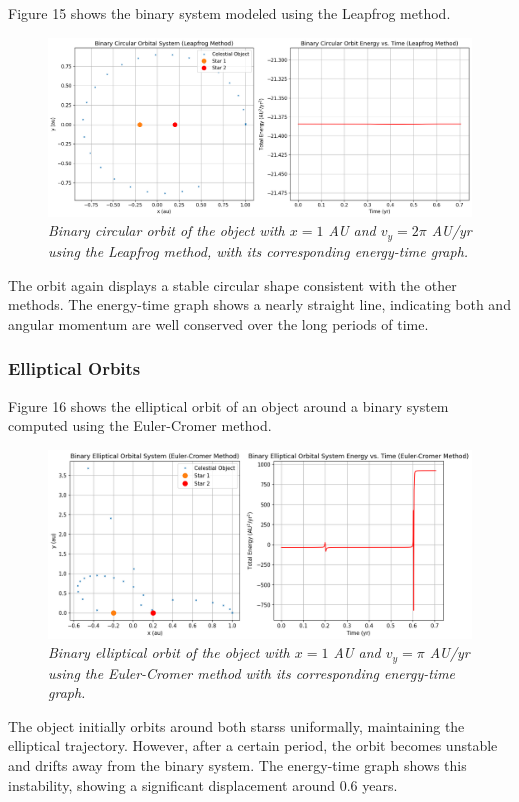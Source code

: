 \documentclass[11 pt, a4paper, twocolumn]{article}
\begin{document}
Figure 15 shows the binary system modeled using the Leapfrog method.
\begin{figure}[H]
  \includegraphics[width=1\linewidth]{binaryleapfrogcircular.png}
  \centering
  \caption{\textit{Binary circular orbit of the object with $x = 1$ AU and $v_y = 2\pi$ AU/yr using
  the Leapfrog method, with its corresponding energy-time graph.}} 
\end{figure}
The orbit again displays a stable circular shape consistent with the other methods. The energy-time 
graph shows a nearly straight line, indicating both and angular momentum are well conserved over the long 
periods of time.

\subsubsection{Elliptical Orbits}
Figure 16 shows the elliptical orbit of an object around a binary system computed using the Euler-Cromer
method.
\begin{figure}[H]
  \includegraphics[width=1\linewidth]{binaryeulerelliptic.png}
  \centering
  \caption{\textit{Binary elliptical orbit of the object with $x = 1$ AU and $v_y = \pi$ AU/yr using
   the Euler-Cromer method with its corresponding energy-time graph.}} 
\end{figure}
The object initially orbits around both starss uniformally, maintaining the elliptical trajectory. 
However, after a certain period, the orbit becomes unstable and drifts away from the binary system. The
energy-time graph shows this instability, showing a significant displacement around 0.6 years.
\end{document}
